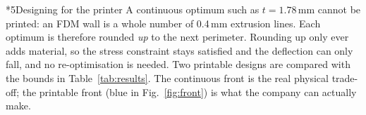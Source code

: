 \documentclass[10pt,a4paper]{article}
\makeatletter
\renewcommand\section{\@startsection{section}{1}{0pt}{8pt plus 2pt}{3pt}{\large\bfseries}}
\makeatother
\begin{document}
\begin{center}
\end{center}

\section*{5\quad Designing for the printer}
A continuous optimum such as $t=1.78$\,mm cannot be printed: an FDM wall is a whole
number of 0.4\,mm extrusion lines. Each optimum is therefore rounded \emph{up} to the
next perimeter. Rounding up only ever adds material, so the stress constraint stays
satisfied and the deflection can only fall, and no re-optimisation is needed. Two
printable designs are compared with the bounds in Table~\ref{tab:results}. The
continuous front is the real physical trade-off; the printable front (blue in
Fig.~\ref{fig:front}) is what the company can actually make.
\end{document}

